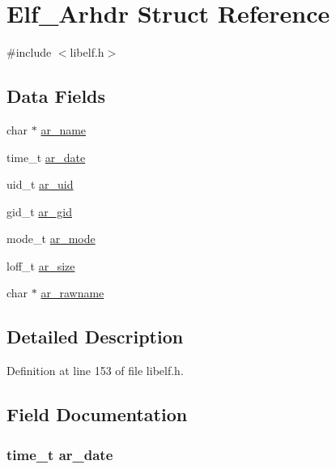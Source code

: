 \hypertarget{struct_elf___arhdr}{\section{\-Elf\-\_\-\-Arhdr \-Struct \-Reference}
\label{struct_elf___arhdr}
}


{\ttfamily \#include $<$libelf.\-h$>$}

\subsection*{\-Data \-Fields}
\begin{DoxyCompactItemize}
\item 
char $\ast$ \hyperlink{struct_elf___arhdr_a6f32a7e7c8bd64df5c2b1fd10f758ccb}{ar\-\_\-name}
\item 
time\-\_\-t \hyperlink{struct_elf___arhdr_afdcdfb007d3663a647e573fcd7476148}{ar\-\_\-date}
\item 
uid\-\_\-t \hyperlink{struct_elf___arhdr_a70452a4221037e637533f4f208bd9122}{ar\-\_\-uid}
\item 
gid\-\_\-t \hyperlink{struct_elf___arhdr_a33bea9112c0482b24dc067b370ba2d51}{ar\-\_\-gid}
\item 
mode\-\_\-t \hyperlink{struct_elf___arhdr_ab1fb4a3f6d72dc9966ec7045ecefaa9c}{ar\-\_\-mode}
\item 
loff\-\_\-t \hyperlink{struct_elf___arhdr_a604bd99d46718a74378e0b1a5690faf4}{ar\-\_\-size}
\item 
char $\ast$ \hyperlink{struct_elf___arhdr_ac6c218297c1c96f8efcf1809635bc1c6}{ar\-\_\-rawname}
\end{DoxyCompactItemize}


\subsection{\-Detailed \-Description}


\-Definition at line 153 of file libelf.\-h.



\subsection{\-Field \-Documentation}
\hypertarget{struct_elf___arhdr_afdcdfb007d3663a647e573fcd7476148}{
\subsubsection[{ar\-\_\-date}]{\setlength{\rightskip}{0pt plus 5cm}time\-\_\-t {\bf ar\-\_\-date}}}\label{struct_elf___arhdr_afdcdfb007d3663a647e573fcd7476148}


